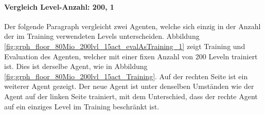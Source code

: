 \paragraph{Vergleich Level-Anzahl: 200, 1}\label{par:durch_EXP_vgl_200_1}
Der folgende Paragraph vergleicht zwei Agenten, welche sich einzig in der Anzahl der im Training verwendeten Levels unterscheiden.
Abbildung \ref{fig:grph_floor_80Mio_200lvl_15act_evalAsTraining_1} zeigt Training und Evaluation des Agenten, welcher mit einer fixen Anzahl von 200 Leveln trainiert ist. Dies ist derselbe Agent, wie in Abbildung \ref{fig:grph_floor_80Mio_200lvl_15act_Training}. Auf der rechten Seite ist ein weiterer Agent gezeigt. Der neue Agent ist unter denselben Umständen wie der Agent auf der linken Seite trainiert, mit dem Unterschied, dass der rechte Agent auf ein einziges Level im Training beschränkt ist.
